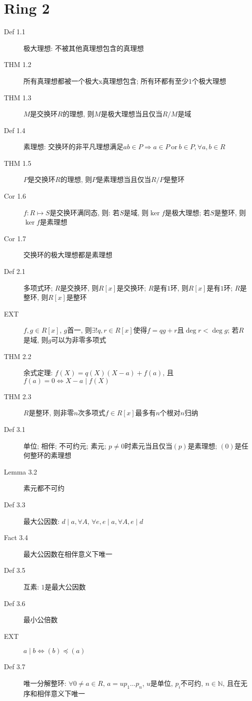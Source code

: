 \documentclass{article}
\begin{document}
    \section{Ring 2}
    \begin{description}
        \item[Def 1.1] 极大理想: 不被其他真理想包含的真理想
        \item[THM 1.2] 所有真理想都被一个极大x真理想包含; 所有环都有至少$1$个极大理想
        \item[THM 1.3] $M$是交换环$R$的理想, 则$M$是极大理想当且仅当$R/M$是域
        \item[Def 1.4] 素理想: 交换环的非平凡理想满足$ab \in P \Rightarrow a \in P~\mathrm{or}~b \in P, \forall a, b \in R$
        \item[THM 1.5] $P$是交换环$R$的理想, 则$P$是素理想当且仅当$R/P$是整环
        \item[Cor 1.6] $f: R\mapsto S$是交换环满同态, 则: 若$S$是域, 则$\ker f$是极大理想; 若$S$是整环, 则$\ker f$是素理想
        \item[Cor 1.7] 交换环的极大理想都是素理想
        \item[Def 2.1] 多项式环; $R$是交换环, 则$R[x]$是交换环; $R$是有$1$环, 则$R[x]$是有$1$环; $R$是整环, 则$R[x]$是整环
        \item[EXT] $f, g \in R[x]$, $g$首一, 则$\exists!q, r \in R[x]$使得$f = qg+r$且$\deg r < \deg g$; 若$R$是域, 则$g$可以为非零多项式
        \item[THM 2.2] 余式定理: $f(X) = q(X)(X-a) + f(a)$, 且$f(a) = 0 \iff X-a \mid f(X)$
        \item[THM 2.3] $R$是整环, 则非零$n$次多项式$f \in R[x]$最多有$n$个根\hfill 对$n$归纳
        \item[Def 3.1] 单位; 相伴; 不可约元; 素元; $p \ne 0$时素元当且仅当$(p)$是素理想; $(0)$是任何整环的素理想
        \item[Lemma 3.2] 素元都不可约
        \item[Def 3.3] 最大公因数: $d \mid a, \forall A$, $\forall e, e \mid a, \forall A, e \mid d$
        \item[Fact 3.4] 最大公因数在相伴意义下唯一
        \item[Def 3.5] 互素: $1$是最大公因数
        \item[Def 3.6] 最小公倍数
        \item[EXT] $a \mid b \iff (b) \preceq (a)$
        \item[Def 3.7] 唯一分解整环: $\forall 0 \ne a \in R$, $a = up_1\dots p_n$, $u$是单位, $p_i$不可约, $n \in \mathbb N$, 且在无序和相伴意义下唯一

\end{description}
\end{document}
